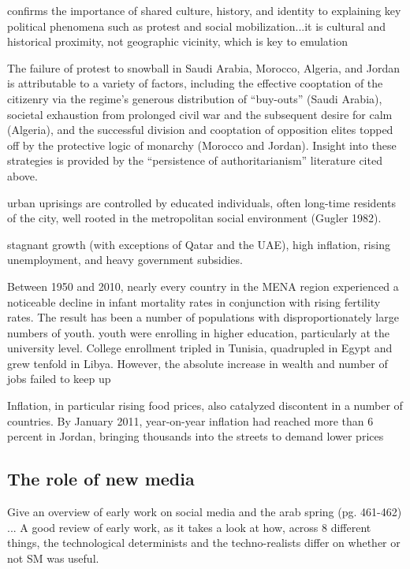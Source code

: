 			confirms the importance of shared culture, history, and identity to explaining key political phenomena such as protest and social mobilization...it is cultural and historical proximity, not geographic vicinity, which is key to emulation	
			
		 The failure of protest to snowball in Saudi Arabia, Morocco, Algeria, and Jordan is attributable to a variety of factors, including the effective cooptation of the citizenry via the regime’s generous distribution of “buy-outs” (Saudi Arabia), societal exhaustion from prolonged civil war and the subsequent desire for calm (Algeria), and the successful division and cooptation of opposition elites topped off by the protective logic of monarchy (Morocco and Jordan). Insight into these strategies is provided by the “persistence of authoritarianism” literature cited above.
		
	\cite{comunello_will_2012}
		urban uprisings are controlled by educated individuals, often long-time residents of the city, well rooted in the metropolitan social environment (Gugler 1982).
		
	\cite{dewey_impact_2012}
	
		stagnant growth (with exceptions of Qatar and the UAE), high inflation, rising unemployment, and heavy government subsidies.
		
		Between 1950 and 2010, nearly every country in the MENA region experienced a noticeable decline in infant mortality rates in conjunction with rising fertility rates. The result has been a number of populations with disproportionately large numbers of youth. youth were enrolling in higher education, particularly at the university level. College enrollment tripled in Tunisia, quadrupled in Egypt and grew tenfold in Libya. However, the absolute increase in wealth and number of jobs failed to keep up
		
		Inflation, in particular rising food prices, also catalyzed discontent in a number of countries. By January 2011, year-on-year inflation had reached more than 6 percent in Jordan, bringing thousands into the streets to demand lower prices


\subsection{The role of new media}

	\citep{comunello_will_2012} Give an overview of early work on social media and the arab spring (pg. 461-462) ... A good review of early work, as it takes a look at how, across 8 different things, the technological determinists and the techno-realists differ on whether or not SM was useful. 
		
